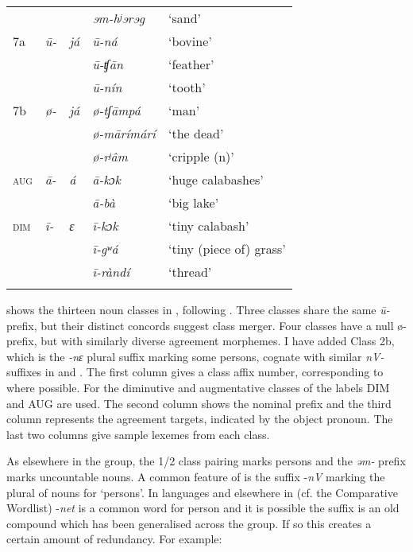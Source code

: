 \documentclass[output=paper]{langsci/langscibook}
\begin{document}
\begin{table}[t!]
\begin{tabularx}{\textwidth}{llXXl}
	& 	& 	& \textit{ɘm-hʲɘrɘg}	& {‘sand’}\\
{7a}	& \textit{\=u-}	& \textit{já}	& \textit{ū-ná}	& {‘bovine’}\\
	& 	& 	& \textit{ū-ʧān}	& {‘feather’}\\
	& 	& 	& \textit{ū-nín}	& {‘tooth’}\\
{7b}	& \textit{ø-}	& \textit{já}	& \textit{ø-tʃāmpá} 	& {‘man’}\\
	& 	& 	& \textit{ø-mārímárí}	& {‘the dead’}\\
	& 	& 	& \textit{ø-rʲâm}	& {‘cripple (n)’}\\
{\textsc{aug}}	& \textit{ā-}	& \textit{á}	& \textit{ā-kɔk}	& {‘huge calabashes’}\\
	& 	& 	& \textit{ā-bà}	& {‘big lake’}\\
{\textsc{dim}}	& \textit{ī-}	& \textit{ɛ}	& \textit{ī-kɔk}	& {‘tiny calabash’}\\
	& 	& 	& \textit{ī-gʷá}	& {‘tiny (piece of) grass’}\\
	& 	& 	& \textit{ī-ràndí}	& {‘thread’}\\
\lspbottomrule
\end{tabularx}
\vspace*{-5mm}
\end{table}
 
 shows the thirteen noun classes in , following \citet{Paterson2012}. Three classes share the same \textit{ū-} prefix, but their distinct concords suggest class \pagebreak  merger. Four classes have a null ø- prefix, but with similarly diverse agreement morphemes. I have added Class 2b, which is the \textit{-nɛ}\textbf{ }plural suffix marking some persons, cognate with similar \textit{nV-} suffixes in  and . The first column gives a class affix number, corresponding to  where possible.  For the diminutive and augmentative classes of  the labels DIM and AUG are used. The second column shows the nominal prefix and the third column represents the agreement targets, indicated by the object pronoun. The last two columns give sample lexemes from each class.


As elsewhere in the group, the 1/2 class pairing marks persons and the \textit{əm-} prefix marks uncountable nouns. A common feature of  is the suffix -\textit{nV} marking the plural of nouns for ‘persons’. In  languages and elsewhere in  (cf. the  Comparative Wordlist) -\textit{net} is a common word for person and it is possible the suffix is an old compound which has been generalised across the group. If so this creates a certain amount of redundancy. For example:
\end{document}
